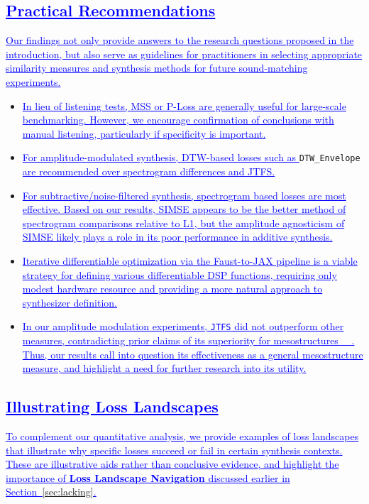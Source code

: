\documentclass[lettersize,journal]{IEEEtran}
\renewcommand{\DIFadd}[1]{\textcolor{blue}{\uline{#1}}}
\newcommand{\JTFS}{\texttt{JTFS}}
\newcommand{\DTWEnv}{\texttt{DTW\_Envelope}}
\newcommand{\PeriodicLoss}{\textbf{Loss Landscape Navigation}} %
\providecommand{\DIFadd}[1]{{\protect\color{blue}\uwave{#1}}} %
\begin{document}
\subsection{\DIFadd{Practical Recommendations}}
    \DIFadd{Our findings not only provide answers to the research questions proposed in the introduction, but also serve as guidelines for practitioners in selecting appropriate similarity measures and synthesis methods for future sound-matching experiments.
}\begin{itemize}
    \item \DIFadd{In lieu of listening tests, MSS or P-Loss are generally useful for large-scale benchmarking. However, we encourage confirmation of conclusions with manual listening, particularly if specificity is important. 
    }\item \DIFadd{For amplitude-modulated synthesis, DTW-based losses such as }\DTWEnv{} \DIFadd{are recommended over spectrogram differences and JTFS.
    }\item  \DIFadd{For subtractive/noise-filtered synthesis, spectrogram based losses are most effective. Based on our results, SIMSE appears to be the better method of spectrogram comparisons relative to L1, but the amplitude agnosticism of SIMSE likely plays a role in its poor performance in additive synthesis.  
    }\item \DIFadd{Iterative differentiable optimization via the Faust-to-JAX pipeline is a viable strategy for defining various differentiable DSP functions, requiring only modest hardware resource and providing a more natural approach to synthesizer definition.
    }\item \DIFadd{In our amplitude modulation experiments, \JTFS{} did not outperform other measures, contradicting prior claims of its superiority for mesostructures~\mbox{%
\cite{vahidi2023mesostructures}}\hskip0pt%
. Thus, our results call into question its effectiveness as a general mesostructure measure, and highlight a need for further research into its utility.
}\end{itemize}

\subsection{\DIFadd{Illustrating Loss Landscapes}}
\label{sec:loss_landscape_examples}
\DIFadd{To complement our quantitative analysis, we provide examples of loss landscapes that illustrate why specific losses succeed or fail in certain synthesis contexts. These are illustrative aids rather than conclusive evidence, and highlight the importance of \PeriodicLoss{} discussed earlier in Section~\ref{sec:lacking}.
}
\end{document}
